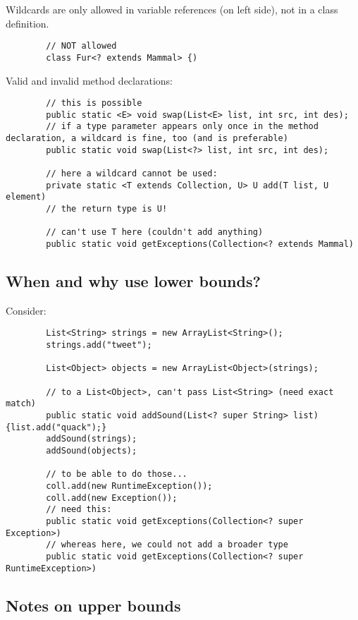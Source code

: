 \documentclass{scrartcl}
\begin{document}
     Wildcards are only allowed in variable references (on left side), not in a class definition.

    \begin{lstlisting}
        // NOT allowed
        class Fur<? extends Mammal> {)
    \end{lstlisting}

    Valid and invalid method declarations:

    \begin{lstlisting}
        // this is possible
        public static <E> void swap(List<E> list, int src, int des);
        // if a type parameter appears only once in the method declaration, a wildcard is fine, too (and is preferable)
        public static void swap(List<?> list, int src, int des);

        // here a wildcard cannot be used:
        private static <T extends Collection, U> U add(T list, U element)
        // the return type is U!

        // can't use T here (couldn't add anything)
        public static void getExceptions(Collection<? extends Mammal)
    \end{lstlisting}

\subsection{When and why use lower bounds?}

    Consider:

    \begin{lstlisting}
        List<String> strings = new ArrayList<String>();
        strings.add("tweet");

        List<Object> objects = new ArrayList<Object>(strings);

        // to a List<Object>, can't pass List<String> (need exact match)
        public static void addSound(List<? super String> list) {list.add("quack");}
        addSound(strings);
        addSound(objects);

        // to be able to do those...
        coll.add(new RuntimeException());
        coll.add(new Exception());
        // need this:
        public static void getExceptions(Collection<? super Exception>)
        // whereas here, we could not add a broader type
        public static void getExceptions(Collection<? super RuntimeException>)

    \end{lstlisting}

\subsection{Notes on upper bounds}
\end{document}
